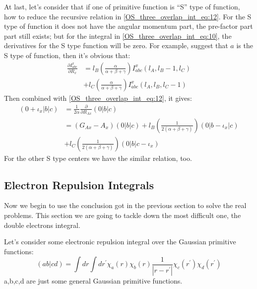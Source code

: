 At last, let's consider that if one of primitive function is ``S'' type of 
function, how to reduce the recursive relation in
\ref{OS_three_overlap_int_eq:12}. For the S type of function it does not have
the angular momentum part, the pre-factor part part still exists; but for the
integral in \ref{OS_three_overlap_int_eq:10}, the derivatives for the S type 
function will be zero. For example, suggest that $a$ is the S type of function,
then it's obvious that:
\begin{equation}
\begin{split}
 \frac{\partial I^{x}_{abc}}{\partial R_{x}} &= 
l_{B}\left(
\frac{\alpha}{\alpha+\beta+\gamma}\right)I^{x}_{abc}(l_{A},l_{B}-1,l_{C}) \\
&+ l_{C}\left(
\frac{\alpha}{\alpha+\beta+\gamma}\right)I^{x}_{abc}(l_{A},l_{B},l_{C}-1) 
\end{split}
 \label{OS_three_overlap_int_eq:13}
\end{equation}
Then combined with \ref{OS_three_overlap_int_eq:12}, it gives:
\begin{equation}
 \begin{split}
 (0+\iota_{x}|b|c) &= \frac{1}{2\alpha}\frac{\partial }{\partial R_{Ax}}(0|b|c) 
\\
&= (G_{Ax} - A_{x})(0|b|c) 
+ l_{B}\left(\frac{1}{2(\alpha+\beta+\gamma)}\right)(0|b-\iota_{x}|c) \\ 
&+ l_{C}\left(\frac{1}{2(\alpha+\beta+\gamma)}\right)(0|b|c-\iota_{x}) 
 \end{split}
\label{OS_three_overlap_int_eq:14}
\end{equation}
For the other S type centers we have the similar relation, too. 
\subsection{Electron Repulsion Integrals}
\label{os_eri}
%
%
%
%
Now we begin to use the conclusion got in the previous section to solve the
real problems. This section we are going to tackle down the most difficult one,
the double electrons integral.

Let's consider some electronic repulsion integral over the
Gaussian primitive functions:
\begin{equation}
 \label{OS_ERI_eq:1}
(ab|cd) = \int dr \int dr^{'} \chi_{a}(r)\chi_{b}(r)\frac{1}{|r-r^{'}|}
\chi_{c}(r^{'})\chi_{d}(r^{'})
\end{equation}
a,b,c,d are just some general Gaussian primitive functions.

